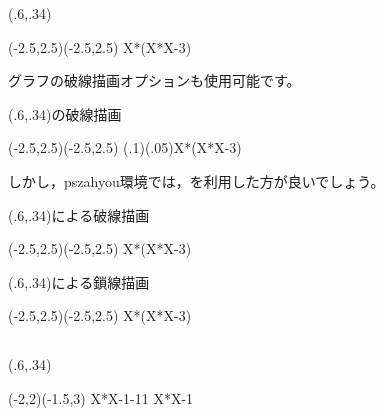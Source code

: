\documentclass[a4j]{jarticle}
\begin{document}
\begin{showEx}(.6,.34){}
\begin{pszahyou}[ul=8mm](-2.5,2.5)(-2.5,2.5)
  \def\Fx{X*(X*X-3)}
  \YGurafu*\Fx
  \Put\A[syaei=xy]{}
  \Put\B[syaei=xy]{}
\end{pszahyou}
\end{showEx}

グラフの破線描画オプションも使用可能です。

\begin{showEx}(.6,.34){の破線描画}
\begin{pszahyou}[ul=8mm](-2.5,2.5)(-2.5,2.5)
  \def\Fx{X*(X*X-3)}
  \YGurafu*(.1)(.05)\Fx
  \Put\A[syaei=xy]{}
  \Put\B[syaei=xy]{}
\end{pszahyou}
\end{showEx}

しかし，\textsf{pszahyou}環境では，を利用した方が良いでしょう。

\begin{showEx}(.6,.34){による破線描画}
\begin{pszahyou}[ul=8mm](-2.5,2.5)(-2.5,2.5)
  \def\Fx{X*(X*X-3)}
  \YGurafu*\Fx
  \Put\A[syaei=xy]{}
  \Put\B[syaei=xy]{}
\end{pszahyou}
\end{showEx}

\begin{showEx}(.6,.34){による鎖線描画}
\begin{pszahyou}[ul=8mm](-2.5,2.5)(-2.5,2.5)
  \def\Fx{X*(X*X-3)}
  \YGurafu*\Fx
  \Put\A[syaei=xy]{}
  \Put\B[syaei=xy]{}
\end{pszahyou}
\end{showEx}


\subsection{\texorpdfstring{}{YNuri}}
\begin{showEx}(.6,.34){}
\begin{pszahyou}[ul=8mm](-2,2)(-1.5,3)
  \def\Fx{X*X-1}
  \YNuri\Fx{-1}{1}
  \YGurafu*\Fx
\end{pszahyou}
\end{showEx}
\end{document}
